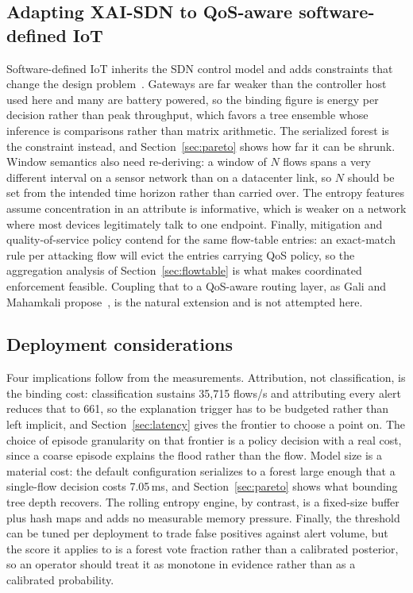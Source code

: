 \documentclass{ieeeaccess}
\begin{document}
\subsection{Adapting XAI-SDN to QoS-aware software-defined IoT}
\label{sec:sdiot}
Software-defined IoT inherits the SDN control model and adds constraints that
change the design problem~\cite{bhayo2023sdiot,gali2025qos}. Gateways are far
weaker than the controller host used here and many are battery powered, so the
binding figure is energy per decision rather than peak throughput, which favors
a tree ensemble whose inference is comparisons rather than matrix arithmetic. The
serialized forest is the constraint instead, and Section~\ref{sec:pareto} shows
how far it can be shrunk. Window semantics also need re-deriving: a window of $N$
flows spans a very different interval on a sensor network than on a datacenter
link, so $N$ should be set from the intended time horizon rather than carried
over. The entropy features assume concentration in an attribute is informative,
which is weaker on a network where most devices legitimately talk to one
endpoint. Finally, mitigation and quality-of-service policy contend for the same
flow-table entries: an exact-match rule per attacking flow will evict the entries
carrying QoS policy, so the aggregation analysis of Section~\ref{sec:flowtable}
is what makes coordinated enforcement feasible. Coupling that to a QoS-aware
routing layer, as Gali and Mahamkali propose~\cite{gali2025qos}, is the natural
extension and is not attempted here.

\subsection{Deployment considerations}
Four implications follow from the measurements. Attribution, not classification, is the binding cost:
classification sustains 35,715 flows/s and attributing every alert reduces that to
661, so the explanation trigger has to be budgeted rather than left implicit, and
Section~\ref{sec:latency} gives the frontier to choose a point on. The choice of
episode granularity on that frontier is a policy decision with a real cost, since
a coarse episode explains the flood rather than the flow. Model size is a material cost: the default configuration serializes to a
forest large enough that a single-flow decision costs 7.05\,ms, and
Section~\ref{sec:pareto} shows what bounding tree depth recovers. The rolling
entropy engine, by contrast, is a fixed-size buffer plus hash maps and adds no
measurable memory pressure. Finally, the threshold can be tuned per deployment to
trade false positives against alert volume, but the score it applies to is a
forest vote fraction rather than a calibrated posterior, so an operator should
treat it as monotone in evidence rather than as a calibrated probability.
\end{document}
